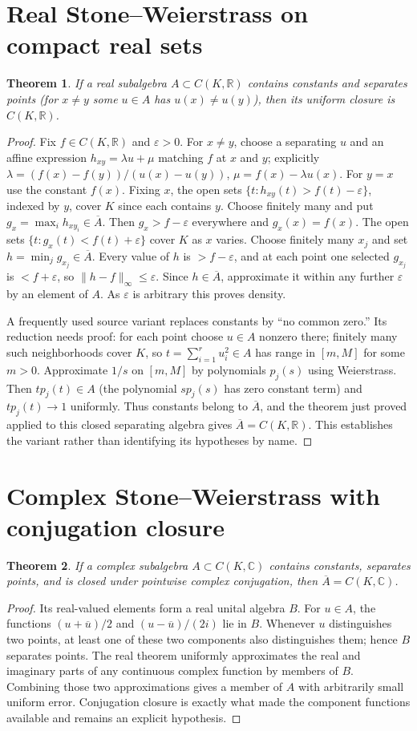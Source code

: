 \documentclass[11pt,oneside,a4paper]{book}
\newtheorem{theorem}{Theorem}[chapter]
\theoremstyle{definition}
\theoremstyle{remark}
\newcommand{\R}{\mathbb R}
\newcommand{\C}{\mathbb C}
\newcommand{\eps}{\varepsilon}
\newcommand{\norm}[1]{\lVert#1\rVert}
\newcommand{\KEntry}[2]{\Needspace{7\baselineskip}\section{#2}\label{#1}{\small\sffamily\color{black!60}\detokenize{#1}}\par}
\begin{document}
\KEntry{K03.16.stone_real}{Real Stone--Weierstrass on compact real sets}
\begin{theorem}
If a real subalgebra $A\subset C(K,\R)$ contains constants and separates points (for $x\ne y$ some $u\in A$ has $u(x)\ne u(y)$), then its uniform closure is $C(K,\R)$.
\end{theorem}
\begin{proof}
Fix $f\in C(K,\R)$ and $\eps>0$. For $x\ne y$, choose a separating $u$ and an affine expression $h_{xy}=\lambda u+\mu$ matching $f$ at $x$ and $y$; explicitly $\lambda=(f(x)-f(y))/(u(x)-u(y))$, $\mu=f(x)-\lambda u(x)$. For $y=x$ use the constant $f(x)$. Fixing $x$, the open sets $\{t:h_{xy}(t)>f(t)-\eps\}$, indexed by $y$, cover $K$ since each contains $y$. Choose finitely many and put $g_x=\max_i h_{xy_i}\in\overline A$. Then $g_x>f-\eps$ everywhere and $g_x(x)=f(x)$. The open sets $\{t:g_x(t)<f(t)+\eps\}$ cover $K$ as $x$ varies. Choose finitely many $x_j$ and set $h=\min_jg_{x_j}\in\overline A$. Every value of $h$ is $>f-\eps$, and at each point one selected $g_{x_j}$ is $<f+\eps$, so $\norm{h-f}_\infty\leq\eps$. Since $h\in\overline A$, approximate it within any further $\eps$ by an element of $A$. As $\eps$ is arbitrary this proves density.

A frequently used source variant replaces constants by ``no common zero.'' Its reduction needs proof: for each point choose $u\in A$ nonzero there; finitely many such neighborhoods cover $K$, so $t=\sum_{i=1}^ru_i^2\in A$ has range in $[m,M]$ for some $m>0$. Approximate $1/s$ on $[m,M]$ by polynomials $p_j(s)$ using Weierstrass. Then $t p_j(t)\in A$ (the polynomial $s p_j(s)$ has zero constant term) and $t p_j(t)\to1$ uniformly. Thus constants belong to $\overline A$, and the theorem just proved applied to this closed separating algebra gives $\overline A=C(K,\R)$. This establishes the variant rather than identifying its hypotheses by name.
\end{proof}

\KEntry{K03.16.stone_complex}{Complex Stone--Weierstrass with conjugation closure}
\begin{theorem}
If a complex subalgebra $A\subset C(K,\C)$ contains constants, separates points, and is closed under pointwise complex conjugation, then $\overline A=C(K,\C)$.
\end{theorem}
\begin{proof}
Its real-valued elements form a real unital algebra $B$. For $u\in A$, the functions $(u+\overline u)/2$ and $(u-\overline u)/(2i)$ lie in $B$. Whenever $u$ distinguishes two points, at least one of these two components also distinguishes them; hence $B$ separates points. The real theorem uniformly approximates the real and imaginary parts of any continuous complex function by members of $B$. Combining those two approximations gives a member of $A$ with arbitrarily small uniform error. Conjugation closure is exactly what made the component functions available and remains an explicit hypothesis.
\end{proof}
\end{document}
